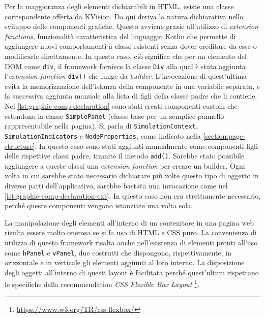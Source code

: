 Per la maggioranza degli elementi dichiarabili in HTML, esiste una classe corrispondente offerta da KVision. Da qui deriva la natura dichiarativa nello sviluppo delle componenti grafiche. Questo avviene grazie all'utilizzo di \textit{extension functions}, funzionalità caratteristica del linguaggio Kotlin che permette di aggiungere nuovi comportamenti a classi esistenti senza dover ereditare da esse o modificarle direttamente. In questo caso, ciò significa che per un elemento del \ac{DOM} come \texttt{div}, il framework fornisce la classe \texttt{Div} alla qual è stata aggiunta l'\textit{extension function} \texttt{div()} che funge da \textit{builder}. L'invocazione di quest'ultima evita la memorizzazione dell'istanza della componente in una variabile separata, e la successiva aggiunta manuale alla lista di figli della classe padre che li contiene.
Nel \cref{lst:graphic-comp-declaration} sono stati creati componenti custom che estendono la classe \texttt{SimplePanel} (classe base per un semplice pannello rappresentabile nella pagina). Si parla di \texttt{SimulationContext}, \texttt{SimulationIndicators} e \texttt{NodeProperties}, come indicato nella \cref{section:page-structure}. In questo caso sono stati aggiunti manualmente come componenti figli delle rispettive classi padre, tramite il metodo \texttt{add()}. Sarebbe stato possibile aggiungere a queste classi una \textit{extension function} per creare un builder. Ogni volta in cui sarebbe stato necessario dichiarare più volte questo tipo di oggetto in diverse parti dell'applicativo, sarebbe bastata una invocazione come nel \cref{lst:graphic-comp-declaration-ext}. In questo caso non era strettamente necessario, perché queste componenti vengono istanziate una volta sola.



La manipolazione degli elementi all'interno di un contenitore in una pagina web risulta essere molto onerosa se si fa uso di HTML e CSS puro. La convenienza di utilizzo di questo framework risalta anche nell'esistenza di elementi pronti all'uso come \texttt{hPanel} e \texttt{vPanel}, due costrutti che dispongono, rispettivamente, in orizzontale e in verticale gli elementi aggiunti al loro interno. La disposizione degli oggetti all'interno di questi layout è facilitata perché quest'ultimi rispettano le specifiche della recommendation \textit{CSS Flexible Box Layout} \footnote{\url{https://www.w3.org/TR/css-flexbox/}}.

